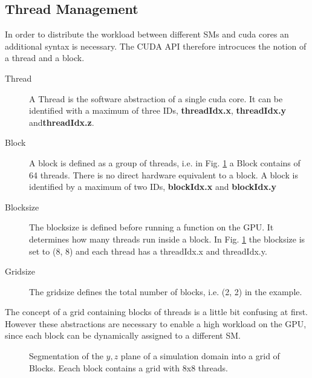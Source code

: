 \clearpage

\subsection{Thread Management}
\label{cuda:sec_threadmanage}

In order to distribute the workload between different SMs and cuda cores an additional syntax is necessary.
The CUDA API therefore  introcuces the notion of a thread and a block.

\begin{description}
    \item[Thread] A Thread is the software abstraction of a single cuda core. It can be identified with
                   a maximum of three IDs, \textbf{threadIdx.x}, \textbf{threadIdx.y} and\textbf{threadIdx.z}.

    \item[Block] A block is defined as a group of threads, i.e. in Fig. \ref{cuda:grid_example} a Block contains of 64 threads.
                 There  is no direct hardware equivalent to a block.
                 A block is identified by a maximum of two IDs, \textbf{blockIdx.x} and \textbf{blockIdx.y}

    \item[Blocksize] The blocksize is defined before running a function on the GPU. It determines how
                    many threads run inside a block. In Fig. \ref{cuda:grid_example} the blocksize is set to (8, 8) and
                    each thread has a threadIdx.x and threadIdx.y.

    \item[Gridsize] The gridsize defines the total number of blocks, i.e. (2, 2) in the example.
\end{description}

The concept of a grid containing blocks of threads is a little bit confusing at first.
However these abstractions are necessary to enable a high workload on the GPU,
since each block can be dynamically assigned to a different SM.


\begin{figure}[!bp]
      \centering
       \caption{Segmentation of the $y, z$ plane of a simulation domain into a grid of Blocks.
                 Eeach block contains a grid with 8x8 threads.}
       \label{cuda:grid_example}
\end{figure}


